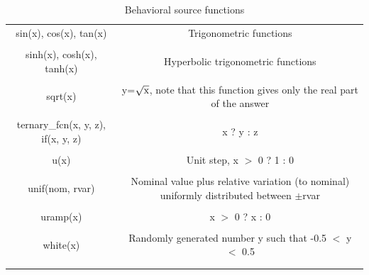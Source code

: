 \begin{longtable}{c c}
sin(x), cos(x), tan(x) & \begin{minipage}{20em}
Trigonometric functions
\end{minipage}\\ \\

sinh(x), cosh(x), tanh(x) & \begin{minipage}{20em}
Hyperbolic trigonometric functions
\end{minipage}\\ \\

sqrt(x) & \begin{minipage}{20em}
y=$\sqrt{\rm{x}}$, note that this function gives only the real part of the answer
\end{minipage}\\ \\


ternary\_fcn(x, y, z), if(x, y, z) & \begin{minipage}{20em}
x ? y : z
\end{minipage}\\ \\

u(x) & \begin{minipage}{20em}
Unit step, x $>$ 0 ? 1 : 0
\end{minipage}\\ \\

unif(nom, rvar) & \begin{minipage}{20em}
Nominal value plus relative variation (to nominal) uniformly distributed between $\pm$rvar
\end{minipage}\\ \\

uramp(x) & \begin{minipage}{20em}
x $>$ 0 ? x : 0
\end{minipage}\\ \\

white(x) & \begin{minipage}{20em}
Randomly generated number y such that -0.5 $<$ y $<$ 0.5
\end{minipage}\\ \\[1ex] %
\hline %

\caption{Behavioral source functions}
\label {tab:paramfuncs}
\end{longtable}

